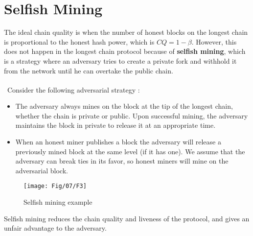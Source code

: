 \section{Selfish Mining}
The ideal chain quality is when the number of honest blocks on the longest chain is proportional to the honest hash power, which is $CQ = 1 - \beta$. However, this does not happen in the longest chain protocol because of \textbf{selfish mining}, which is a strategy where an adversary tries to create a private fork and withhold it from the network until he can overtake the public chain. \\\\\
Consider the following adversarial strategy :
\begin{itemize}
	\item The adversary always mines on the block at the tip of the longest chain, whether the chain is private or public. Upon successful mining, the adversary maintains the block in private to release it at an appropriate time.
	\item When an honest miner publishes a block the adversary will release a previously mined block
	at the same level (if it has one). We assume that the adversary can break ties in its favor, so
	honest miners will mine on the adversarial block.
\end{itemize}
\begin{figure}[h!]
	\centering
	\texttt{[image: Fig/07/F3]}
	\caption{Selfish mining example}
	\label{fig:l7_f3}
\end{figure}
Selfish mining reduces the chain quality and liveness of the protocol, and gives an unfair advantage to the adversary.

